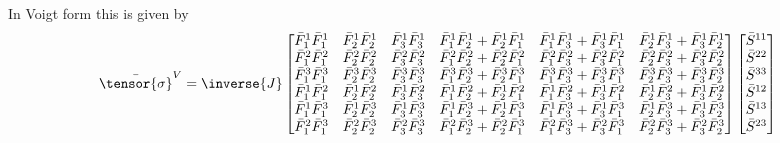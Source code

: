 In Voigt form this is given by
\begin{equation}
  \bar{\tensor{\sigma}}^{V}=\inverse{J}\begin{bmatrix}
  \bar{F}_{1}^{1}\bar{F}_{1}^{1} & \bar{F}_{2}^{1}\bar{F}_{2}^{1} & \bar{F}_{3}^{1}\bar{F}_{3}^{1} &
  \bar{F}_{1}^{1}\bar{F}_{2}^{1} + \bar{F}_{2}^{1}\bar{F}_{1}^{1} &
  \bar{F}_{1}^{1}\bar{F}_{3}^{1} + \bar{F}_{3}^{1}\bar{F}_{1}^{1} &
  \bar{F}_{2}^{1}\bar{F}_{3}^{1} + \bar{F}_{3}^{1}\bar{F}_{2}^{1} \\
  \bar{F}_{1}^{2}\bar{F}_{1}^{2} & \bar{F}_{2}^{2}\bar{F}_{2}^{2} & \bar{F}_{3}^{2}\bar{F}_{3}^{2} &
  \bar{F}_{1}^{2}\bar{F}_{2}^{2} + \bar{F}_{2}^{2}\bar{F}_{1}^{2} &
  \bar{F}_{1}^{2}\bar{F}_{3}^{2} + \bar{F}_{3}^{2}\bar{F}_{1}^{2} &
  \bar{F}_{2}^{2}\bar{F}_{3}^{2} + \bar{F}_{3}^{2}\bar{F}_{2}^{2} \\
  \bar{F}_{1}^{3}\bar{F}_{1}^{3} & \bar{F}_{2}^{3}\bar{F}_{2}^{3} & \bar{F}_{3}^{3}\bar{F}_{3}^{3} &
  \bar{F}_{1}^{3}\bar{F}_{2}^{3} + \bar{F}_{2}^{3}\bar{F}_{1}^{3} &
  \bar{F}_{1}^{3}\bar{F}_{3}^{3} + \bar{F}_{3}^{3}\bar{F}_{1}^{3} &
  \bar{F}_{2}^{3}\bar{F}_{3}^{3} + \bar{F}_{3}^{3}\bar{F}_{2}^{3} \\
  \bar{F}_{1}^{1}\bar{F}_{1}^{2} & \bar{F}_{2}^{1}\bar{F}_{2}^{2} & \bar{F}_{3}^{1}\bar{F}_{3}^{2} &
  \bar{F}_{1}^{1}\bar{F}_{2}^{2} + \bar{F}_{2}^{1}\bar{F}_{1}^{2} &
  \bar{F}_{1}^{1}\bar{F}_{3}^{2} + \bar{F}_{3}^{1}\bar{F}_{1}^{2} &
  \bar{F}_{2}^{1}\bar{F}_{3}^{2} + \bar{F}_{3}^{1}\bar{F}_{2}^{2} \\
  \bar{F}_{1}^{1}\bar{F}_{1}^{3} & \bar{F}_{2}^{1}\bar{F}_{2}^{3} & \bar{F}_{3}^{1}\bar{F}_{3}^{3} &
  \bar{F}_{1}^{1}\bar{F}_{2}^{3} + \bar{F}_{2}^{1}\bar{F}_{1}^{3} &
  \bar{F}_{1}^{1}\bar{F}_{3}^{3} + \bar{F}_{3}^{1}\bar{F}_{1}^{3} &
  \bar{F}_{2}^{1}\bar{F}_{3}^{3} + \bar{F}_{3}^{1}\bar{F}_{2}^{3} \\
  \bar{F}_{1}^{2}\bar{F}_{1}^{3} & \bar{F}_{2}^{2}\bar{F}_{2}^{3} & \bar{F}_{3}^{2}\bar{F}_{3}^{3} &
  \bar{F}_{1}^{2}\bar{F}_{2}^{3} + \bar{F}_{2}^{2}\bar{F}_{1}^{3} &
  \bar{F}_{1}^{2}\bar{F}_{3}^{3} + \bar{F}_{3}^{2}\bar{F}_{1}^{3} &
  \bar{F}_{2}^{2}\bar{F}_{3}^{3} + \bar{F}_{3}^{2}\bar{F}_{2}^{3} 
  \end{bmatrix}\begin{bmatrix}
    \bar{S}^{11} \\
    \bar{S}^{22} \\
    \bar{S}^{33} \\
    \bar{S}^{12} \\
    \bar{S}^{13} \\
    \bar{S}^{23}
  \end{bmatrix}
\end{equation}

